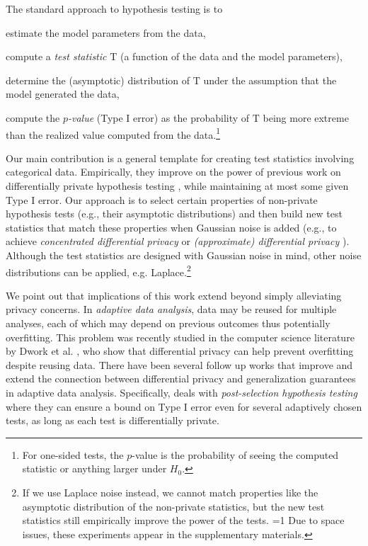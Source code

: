 \documentclass[twoside,letterpaper]{article} \usepackage{aistats2017}
\theoremstyle{definition}
\theoremstyle{remark}
\begin{document}
The standard approach to hypothesis testing is to
\begin{inparaenum}[(1)]
\item estimate the model parameters from the data, 
\item compute a \emph{test statistic} ${\mathrm{T}}$ (a function of the data and the model parameters),
\item determine the (asymptotic) distribution of ${\mathrm{T}}$ under the assumption that the model generated the data,
\item compute the \emph{$p$-value} (Type I error) as the probability of ${\mathrm{T}}$ being more extreme than the realized value computed from the data.\footnote{For one-sided tests, the $p$-value is the probability of seeing the computed statistic or anything larger under $H_0$.}
\end{inparaenum}

Our main contribution is a general template for creating test statistics involving categorical data. Empirically, they improve on the power of previous work on differentially private hypothesis testing \cite{GLRV16,WLK15}, while maintaining at most some given Type I error. Our approach is to select certain properties of non-private hypothesis tests (e.g., their asymptotic distributions) and then build new test statistics that match these properties when Gaussian noise is added (e.g., to achieve \emph{concentrated differential privacy} \cite{DR16,BS16} or \emph{(approximate) differential privacy} \cite{DKMMN06}). Although the test statistics are designed with Gaussian noise in mind, other noise distributions can be applied, e.g. Laplace.\footnote{If we use Laplace noise instead, we cannot match properties like the asymptotic distribution of the non-private statistics, but the new test statistics still empirically improve the power of the tests. 
=1
Due to space issues, these experiments appear in the supplementary materials.
\fi} 

We point out that implications of this work extend beyond simply alleviating privacy concerns. In \emph{adaptive data analysis}, data may be reused for multiple analyses, each of which may depend on previous outcomes thus potentially overfitting.  This problem was recently studied in the computer science literature by Dwork et al. \cite{DFHPRR15}, who show that differential privacy can help prevent overfitting despite reusing data.  There have been several follow up works \cite{DFHPRR15Nips,CLNRW16,BNSSSU16} that improve and extend the connection between differential privacy and generalization guarantees in adaptive data analysis.  Specifically, \cite{RRST16} deals with \emph{post-selection hypothesis testing} where they can ensure a bound on Type I error even for several adaptively chosen tests, as long as each test is differentially private.
\end{document}
